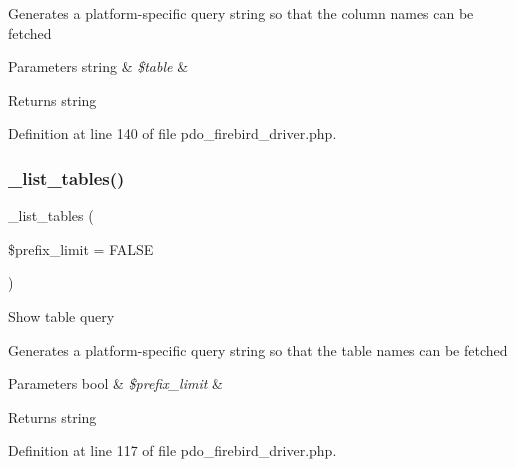 Generates a platform-\/specific query string so that the column names can be fetched


\begin{DoxyParams}[1]{Parameters}
string & {\em \$table} & \\
\hline
\end{DoxyParams}
\begin{DoxyReturn}{Returns}
string 
\end{DoxyReturn}


Definition at line 140 of file pdo\+\_\+firebird\+\_\+driver.\+php.

\mbox{\label{class_c_i___d_b__pdo__firebird__driver_a435c0f3ce54fe7daa178baa8532ebd54}} 
\subsubsection{\texorpdfstring{\_list\_tables()}{\_list\_tables()}}
{\footnotesize\ttfamily \+\_\+list\+\_\+tables (\begin{DoxyParamCaption}\item[{}]{\$prefix\+\_\+limit = {\ttfamily FALSE} }\end{DoxyParamCaption})\hspace{0.3cm}{\ttfamily [protected]}}

Show table query

Generates a platform-\/specific query string so that the table names can be fetched


\begin{DoxyParams}[1]{Parameters}
bool & {\em \$prefix\+\_\+limit} & \\
\hline
\end{DoxyParams}
\begin{DoxyReturn}{Returns}
string 
\end{DoxyReturn}


Definition at line 117 of file pdo\+\_\+firebird\+\_\+driver.\+php.

\mbox{\label{class_c_i___d_b__pdo__firebird__driver_aa029600528fc1ce660a23ff4b4667f95}} 
